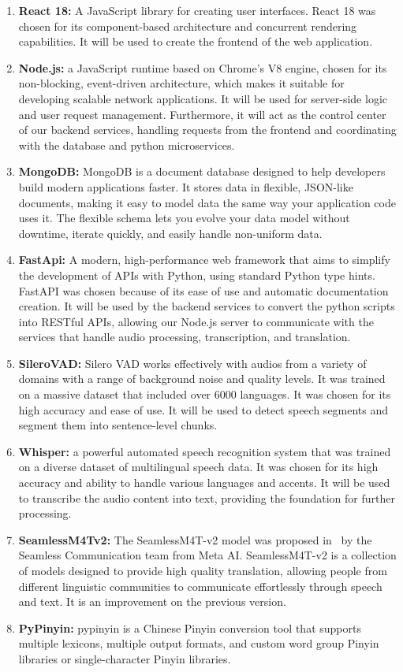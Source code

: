 \documentclass[oneside]{utmthesis}
\begin{document}
\begin{enumerate}[label= (\alph*)]
    \item \textbf{React 18:} A JavaScript library for creating user interfaces. React 18 was chosen for its component-based architecture and concurrent rendering capabilities. It will be used to create the frontend of the web application.
    \item \textbf{Node.js:} a JavaScript runtime based on Chrome's V8 engine, chosen for its non-blocking, event-driven architecture, which makes it suitable for developing scalable network applications. It will be used for server-side logic and user request management. Furthermore, it will act as the control center of our backend services, handling requests from the frontend and coordinating with the database and python microservices.
    \item \textbf{MongoDB:} MongoDB is a document database designed to help developers build modern applications faster. It stores data in flexible, JSON-like documents, making it easy to model data the same way your application code uses it. The flexible schema lets you evolve your data model without downtime, iterate quickly, and easily handle non-uniform data.
    \item \textbf{FastApi:} A modern, high-performance web framework that aims to simplify the development of APIs with Python, using standard Python type hints. FastAPI was chosen because of its ease of use and automatic documentation creation. It will be used by the backend services to convert the python scripts into RESTful APIs, allowing our Node.js server to communicate with the services that handle audio processing, transcription, and translation.
    \item \textbf{SileroVAD:} Silero VAD works effectively with audios from a variety of domains with a range of background noise and quality levels. It was trained on a massive dataset that included over 6000 languages. It was chosen for its high accuracy and ease of use. It will be used to detect speech segments and segment them into sentence-level chunks.
    \item \textbf{Whisper:} a powerful automated speech recognition system that was trained on a diverse dataset of multilingual speech data. It was chosen for its high accuracy and ability to handle various languages and accents. It will be used to transcribe the audio content into text, providing the foundation for further processing.
    \item \textbf{SeamlessM4Tv2:} The SeamlessM4T-v2 model was proposed in~\citep{barrault2023seamless} by the Seamless Communication team from Meta AI. SeamlessM4T-v2 is a collection of models designed to provide high quality translation, allowing people from different linguistic communities to communicate effortlessly through speech and text. It is an improvement on the previous version.
    \item \textbf{PyPinyin:} pypinyin is a Chinese Pinyin conversion tool that supports multiple lexicons, multiple output formats, and custom word group Pinyin libraries or single-character Pinyin libraries.

\end{enumerate}
\end{document}
